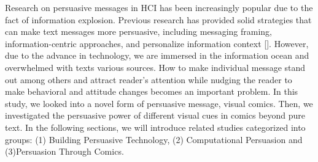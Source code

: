 Research on persuasive messages in HCI has been increasingly popular due to the fact of information explosion. Previous research has provided solid strategies that can make text messages more persuasive, including messaging framing, information-centric approaches, and personalize information context []. However, due to the advance in technology, we are immersed in the information ocean and overwhelmed with texts various sources. How to make individual message stand out among others and attract reader's attention while nudging the reader to make behavioral and attitude changes becomes an important problem. In this study, we looked into a novel form of persuasive message, visual comics. Then, we investigated the persuasive power of different visual cues in comics beyond pure text. In the following sections, we will introduce related studies categorized into groups: (1) Building Persuasive Technology, (2) Computational Persuasion and (3)Persuasion Through Comics.\par

